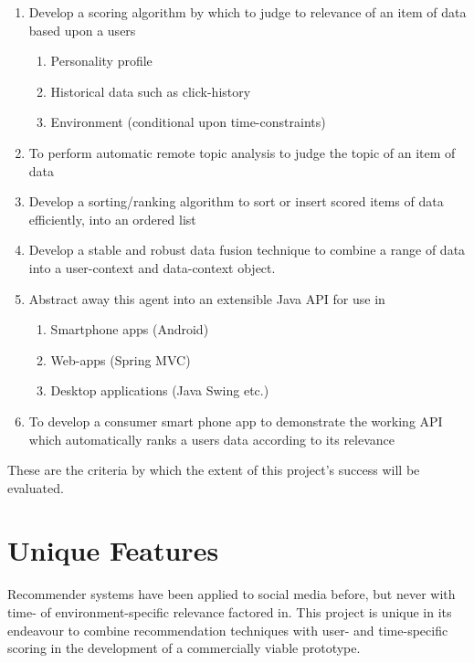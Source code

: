 \begin{enumerate}
	\item Develop a scoring algorithm by which to judge to relevance of an item of data based upon a users
	\begin{enumerate}
		\item Personality profile
		\item Historical data such as click-history
		\item Environment (conditional upon time-constraints)
	\end{enumerate}
	\item To perform automatic remote topic analysis to judge the topic of an item of data
	\item Develop a sorting/ranking algorithm to sort or insert scored items of data efficiently, into an ordered list
	\item Develop a stable and robust data fusion technique to combine a range of data into a user-context and data-context object.
	\item Abstract away this agent into an extensible Java API for use in
	\begin{enumerate}
		\item Smartphone apps (Android)
		\item Web-apps (Spring MVC)
		\item Desktop applications (Java Swing etc.)
	\end{enumerate}
	\item To develop a consumer smart phone app to demonstrate the working API which automatically ranks a users data according to its relevance
\end{enumerate}

These are the criteria by which the extent of this project's success will be evaluated.

\section{Unique Features}

Recommender systems have been applied to social media before, but never with time- of environment-specific relevance factored in. This project is unique in its endeavour to combine recommendation techniques with user- and time-specific scoring in the development of a commercially viable prototype. 
